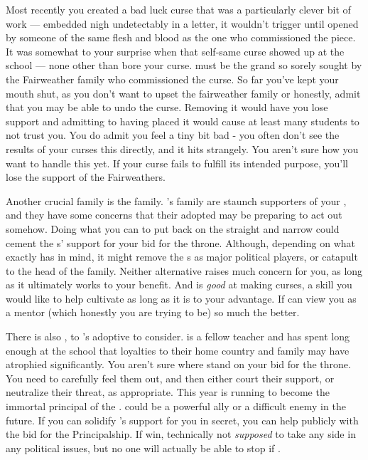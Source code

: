 \documentclass[char]{GL2020}
\begin{document}
Most recently you created a bad luck curse that was a particularly clever bit of work — embedded nigh undetectably in a letter, it wouldn't trigger until opened by someone of the same flesh and blood as the one who commissioned the piece. It was somewhat to your surprise when that self-same curse showed up at the school — none other than \cInitiate{\full} bore your curse. \cInitiate{\They} must be the grand\cInitiate{\offspring} so sorely sought by the Fairweather family who commissioned the curse. So far you've kept your mouth shut, as you don't want to upset the fairweather family or honestly, admit that you may be able to undo the curse. Removing it would have you lose support and admitting to having placed it would cause at least many students to not trust you.  You do admit you feel a tiny bit bad - you often don't see the results of your curses this directly, and it hits strangely. You aren’t sure how you want to handle this yet. If your curse fails to fulfill its intended purpose, you'll lose the support of the Fairweathers.

Another crucial family is the \cAdopted{\formal} family. \cAdopted{\full}'s family are staunch supporters of your \cQueen{\parent}, and they have some concerns that their adopted \cAdopted{\offspring} may be preparing to act out somehow. Doing what you can to put \cAdopted{\them} back on the straight and narrow could cement the \cAdopted{\formal}s' support for your bid for the throne. Although, depending on what exactly \cAdopted{} has in mind, it might remove the \cAdopted{\formal}s as major political players, or catapult \cAdopted{} to the head of the family. Neither alternative raises much concern for you, as long as it ultimately works to your benefit. And \cAdopted{} is \emph{good} at making curses, a skill you would like to help \cAdopted{\them} cultivate as long as it is to your advantage. If \cAdopted{} can view you as a mentor (which honestly you are trying to be) so much the better.

There is also \cMusic{\full}, \cMusic{\auncle} to \cAdopted{}'s adoptive \cAdoptedParentOne{\parent} to consider. \cMusic{} is a fellow teacher and has spent long enough at the school that \cMusic{\their} loyalties to their home country and family may have atrophied significantly. You aren't sure where \cMusic{\they} stand on your bid for the throne. You need to carefully feel them out, and then either court their support, or neutralize their threat, as appropriate.  This year \cMusic{} is running to become the immortal principal of the \pSc{}. \cMusic{\They} could be a powerful ally or a difficult enemy in the future. If you can solidify \cMusic{}’s support for you in secret, you can help \cMusic{\them} publicly with the bid for the Principalship. If  \cMusic{\they} win\cMusic{\verbs}, technically \cMusic{\they \are} not \emph{supposed} to take any side in any political issues, but no one will actually be able to stop \cMusic{\them} if \cMusic{\they \do}.
\end{document}
